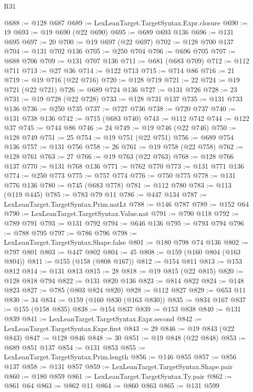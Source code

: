 \begin{lexlean}{R31}
\begin{coremodule}
@688 := @128 @687
@689 := LexLeanTarget.TargetSyntax.Expr.closure
@690 := 19
@693 := @19 @690 (@22 @690)
@695 := @689 @693 @136
@696 := @131 @695
@697 := 20
@700 := @19 @697 (@22 @697)
@702 := @128 @700 @137
@704 := @131 @702 @136
@705 := @250 @704
@706 := @696 @705
@707 := @688 @706
@709 := @131 @707 @136
@711 := @681 (@683 @709)
@712 := @112 @711
@713 := @27 @36
@714 := @122 @713
@715 := @714 @86
@716 := 21
@719 := @19 @716 (@22 @716)
@720 := @128 @719
@721 := 22
@724 := @19 @721 (@22 @721)
@726 := @689 @724 @136
@727 := @131 @726
@728 := 23
@731 := @19 @728 (@22 @728)
@733 := @128 @731 @137
@735 := @131 @733 @136
@736 := @250 @735
@737 := @727 @736
@738 := @720 @737
@740 := @131 @738 @136
@742 := @715 (@683 @740)
@743 := @112 @742
@744 := @122 @37
@745 := @744 @86
@746 := 24
@749 := @19 @746 (@22 @746)
@750 := @128 @749
@751 := 25
@754 := @19 @751 (@22 @751)
@756 := @689 @754 @136
@757 := @131 @756
@758 := 26
@761 := @19 @758 (@22 @758)
@762 := @128 @761
@763 := 27
@766 := @19 @763 (@22 @763)
@768 := @128 @766 @137
@770 := @131 @768 @136
@771 := @762 @770
@773 := @131 @771 @136
@774 := @250 @773
@775 := @757 @774
@776 := @750 @775
@778 := @131 @776 @136
@780 := @745 (@683 @778)
@781 := @112 @780
@783 := @113 (@119 @445)
@785 := @783 @79 @11
@786 := @447 @134
@787 := LexLeanTarget.TargetSyntax.Prim.natLt
@788 := @146 @787
@789 := @152 @64
@790 := LexLeanTarget.TargetSyntax.Value.nat
@791 := @790 @118
@792 := @789 @791
@793 := @131 @792
@794 := @646 @136
@795 := @793 @794
@796 := @788 @795
@797 := @786 @796
@798 := LexLeanTarget.TargetSyntax.Shape.false
@801 := @180 @798 @74 @136
@802 := @797 @801
@803 := @447 @802
@804 := 45
@808 := @159 (@160 @804 (@163 @804))
@811 := @155 (@158 (@808 @167))
@812 := @154 @811
@813 := @153 @812
@814 := @131 @813
@815 := 28
@818 := @19 @815 (@22 @815)
@820 := @128 @818 @794
@822 := @131 @820 @136
@823 := @814 @822
@824 := @148 @823
@827 := @785 (@803 @824 @820)
@828 := @112 @827
@829 := @653 @11
@830 := 34
@834 := @159 (@160 @830 (@163 @830))
@835 := @834 @167
@837 := @155 (@158 @835)
@838 := @154 @837
@839 := @153 @838
@840 := @131 @839
@841 := LexLeanTarget.TargetSyntax.Expr.second
@842 := LexLeanTarget.TargetSyntax.Expr.first
@843 := 29
@846 := @19 @843 (@22 @843)
@847 := @128 @846
@848 := 30
@851 := @19 @848 (@22 @848)
@853 := @689 @851 @137
@854 := @131 @853
@855 := LexLeanTarget.TargetSyntax.Prim.length
@856 := @146 @855
@857 := @856 @137
@858 := @131 @857
@859 := LexLeanTarget.TargetSyntax.Shape.pair
@860 := @180 @859
@861 := LexLeanTarget.TargetSyntax.Ty.pair
@862 := @861 @64
@863 := @862 @11
@864 := @860 @863
@865 := @131 @599

\end{coremodule}
\end{lexlean}
